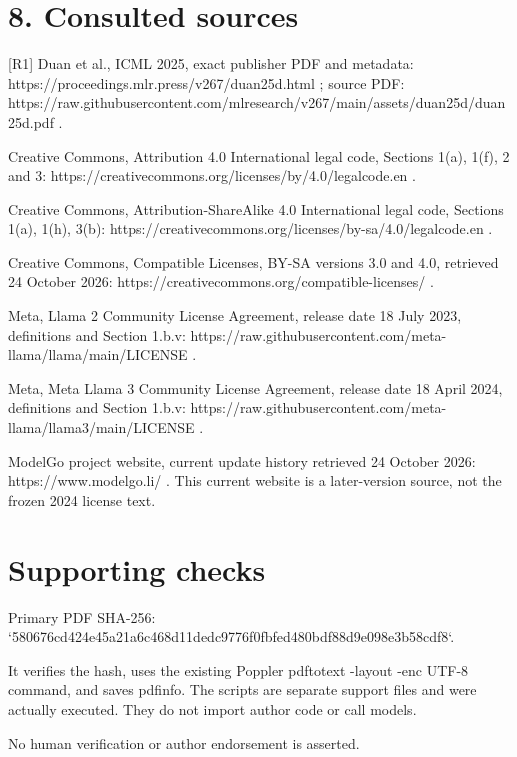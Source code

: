\documentclass[10pt]{article}
\begin{document}
\section*{8. Consulted sources}
[R1] Duan et al., ICML 2025, exact publisher PDF and metadata: https://proceedings.mlr.press/v267/duan25d.html ; source PDF: https://raw.githubusercontent.com/mlresearch/v267/main/assets/duan25d/duan25d.pdf .\par
[R2] Creative Commons, Attribution 4.0 International legal code, Sections 1(a), 1(f), 2 and 3: https://creativecommons.org/licenses/by/4.0/legalcode.en .\par
[R3] Creative Commons, Attribution-ShareAlike 4.0 International legal code, Sections 1(a), 1(h), 3(b): https://creativecommons.org/licenses/by-sa/4.0/legalcode.en .\par
[R4] Creative Commons, Compatible Licenses, BY-SA versions 3.0 and 4.0, retrieved 24 October 2026: https://creativecommons.org/compatible-licenses/ .\par
[R5] Meta, Llama 2 Community License Agreement, release date 18 July 2023, definitions and Section 1.b.v: https://raw.githubusercontent.com/meta-llama/llama/main/LICENSE .\par
[R6] Meta, Meta Llama 3 Community License Agreement, release date 18 April 2024, definitions and Section 1.b.v: https://raw.githubusercontent.com/meta-llama/llama3/main/LICENSE .\par
[R7] ModelGo project website, current update history retrieved 24 October 2026: https://www.modelgo.li/ . This current website is a later-version source, not the frozen 2024 license text.\par
\section*{Supporting checks}
Primary PDF SHA-256: `580676cd424e45a21a6c468d11dedc9776f0fbfed480bdf88d9e098e3b58cdf8`.\par
It verifies the hash, uses the existing Poppler pdftotext -layout -enc UTF-8 command, and saves pdfinfo. The scripts are separate support files and were actually executed. They do not import author code or call models.\par
No human verification or author endorsement is asserted.\par
\end{document}
